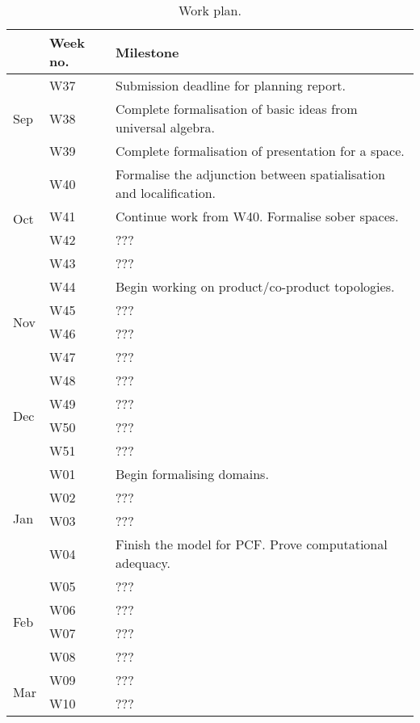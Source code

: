 \documentclass{article}
\begin{document}
\begin{table}[]\caption{Work plan.}\label{table:plan}
\begin{tabular}{lll}
&      Week no. & Milestone                                                                  \\\hline
\multirow{3}{*}{Sep} & W37  & Submission deadline for planning report. \\
                     & W38  & Complete formalisation of basic ideas from universal algebra. \\
                     & W39  & Complete formalisation of presentation for a space. \\ \hline
\multirow{4}{*}{Oct} & W40  & Formalise the adjunction between spatialisation and localification. \\
                     & W41  & Continue work from W40. Formalise sober spaces. \\
                     & W42  & ??? \\
                     & W43  & ??? \\ \hline
\multirow{4}{*}{Nov} & W44  & Begin working on product/co-product topologies. \\
                     & W45  & ??? \\
                     & W46  & ??? \\
                     & W47  & ??? \\ \hline
\multirow{4}{*}{Dec} & W48  & ??? \\
                     & W49  & ??? \\
                     & W50  & ??? \\
                     & W51  & ??? \\ \hline
\multirow{4}{*}{Jan} & W01  & Begin formalising domains. \\
                     & W02  & ??? \\
                     & W03  & ??? \\
                     & W04  & Finish the model for PCF. Prove computational adequacy. \\ \hline
\multirow{4}{*}{Feb} & W05  & ??? \\
                     & W06  & ??? \\
                     & W07  & ??? \\
                     & W08  & ??? \\ \hline
\multirow{4}{*}{Mar} & W09  & ??? \\
                     & W10  & ??? \\

\end{tabular}
\end{table}
\end{document}
